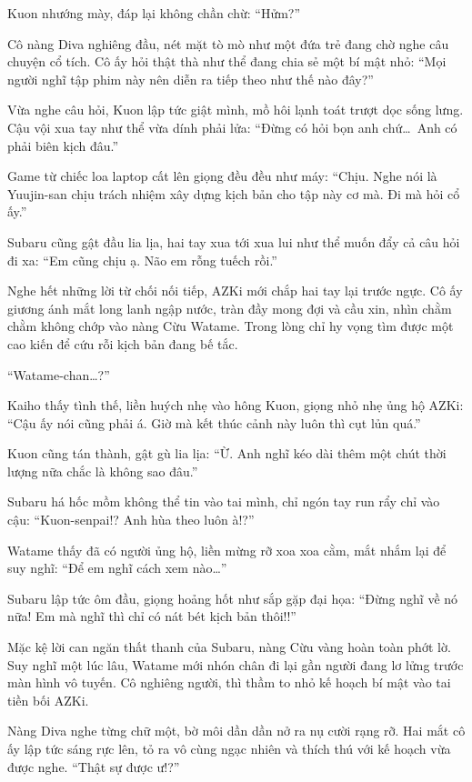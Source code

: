 \documentclass[../main.tex]{subfiles}
\begin{document}
Kuon nhướng mày, đáp lại không chần chừ: ``Hửm?''

Cô nàng Diva nghiêng đầu, nét mặt tò mò như một đứa trẻ đang chờ nghe câu chuyện cổ tích. Cô ấy hỏi thật thà như thể đang chia sẻ một bí mật nhỏ: ``Mọi người nghĩ tập phim này nên diễn ra tiếp theo như thế nào đây?''

Vừa nghe câu hỏi, Kuon lập tức giật mình, mồ hôi lạnh toát trượt dọc sống lưng. Cậu vội xua tay như thể vừa dính phải lửa: ``Đừng có hỏi bọn anh chứ\dots\ Anh có phải biên kịch đâu.''

Game từ chiếc loa laptop cất lên giọng đều đều như máy: ``Chịu. Nghe nói là Yuujin-san chịu trách nhiệm xây dựng kịch bản cho tập này cơ mà. Đi mà hỏi cổ ấy.''

Subaru cũng gật đầu lia lịa, hai tay xua tới xua lui như thể muốn đẩy cả câu hỏi đi xa: ``Em cũng chịu ạ. Não em rỗng tuếch rồi.''

Nghe hết những lời từ chối nối tiếp, AZKi mới chắp hai tay lại trước ngực. Cô ấy giương ánh mắt long lanh ngập nước, tràn đầy mong đợi và cầu xin, nhìn chằm chằm không chớp vào nàng Cừu Watame. Trong lòng chỉ hy vọng tìm được một cao kiến để cứu rỗi kịch bản đang bế tắc.


``Watame-chan\dots?''

Kaiho thấy tình thế, liền huých nhẹ vào hông Kuon, giọng nhỏ nhẹ ủng hộ AZKi: ``Cậu ấy nói cũng phải á. Giờ mà kết thúc cảnh này luôn thì cụt lủn quá.''

Kuon cũng tán thành, gật gù lia lịa: ``Ừ. Anh nghĩ kéo dài thêm một chút thời lượng nữa chắc là không sao đâu.''

Subaru há hốc mồm không thể tin vào tai mình, chỉ ngón tay run rẩy chỉ vào cậu: ``Kuon-senpai!? Anh hùa theo luôn à!?''

Watame thấy đã có người ủng hộ, liền mừng rỡ xoa xoa cằm, mắt nhắm lại để suy nghĩ: ``Để em nghĩ cách xem nào\dots''

Subaru lập tức ôm đầu, giọng hoảng hốt như sắp gặp đại họa: ``Đừng nghĩ về nó nữa! Em mà nghĩ thì chỉ có nát bét kịch bản thôi!!''

Mặc kệ lời can ngăn thất thanh của Subaru, nàng Cừu vàng hoàn toàn phớt lờ. Suy nghĩ một lúc lâu, Watame mới nhón chân đi lại gần người đang lơ lửng trước màn hình vô tuyến. Cô nghiêng người, thì thầm to nhỏ kế hoạch bí mật vào tai tiền bối AZKi.

Nàng Diva nghe từng chữ một, bờ môi dần dần nở ra nụ cười rạng rỡ. Hai mắt cô ấy lập tức sáng rực lên, tỏ ra vô cùng ngạc nhiên và thích thú với kế hoạch vừa được nghe. ``Thật sự được ư!?''
\end{document}
